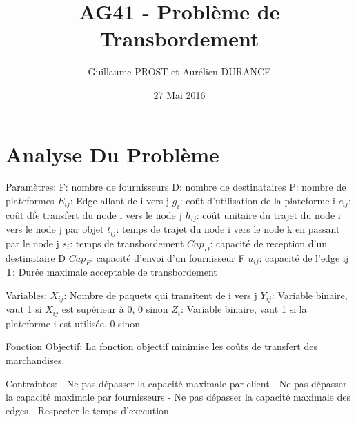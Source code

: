 \documentclass[a4paper,10pt]{article}
\title{AG41 - Problème de Transbordement}
\author{Guillaume PROST et Aurélien DURANCE}
\date{27 Mai 2016}
\begin{document}
\maketitle
\section{Analyse Du Problème}

\hspace{0.5cm} Paramètres:\newline
F: nombre de fournisseurs\newline
D: nombre de destinataires\newline
P: nombre de plateformes\newline
$E_{ij}$: Edge allant de i vers j\newline
$g_{i}$: coût d'utilisation de la plateforme i\newline
$c_{ij}$: coût dfe transfert du node i vers le node j\newline
$h_{ij}$: coût unitaire du trajet du node i vers le node j par objet\newline
$t_{ij}$: temps de trajet du node i vers le node k en passant par le node j\newline
$s_{i}$: temps de transbordement\newline
$Cap_{D}$: capacité de reception d'un destinataire D\newline
$Cap_{F}$: capacité d'envoi d'un fournisseur F\newline
$u_{ij}$: capacité de l'edge ij\newline
T: Durée maximale acceptable de transbordement

Variables:\newline
$X_{ij}$: Nombre de paquets qui transitent de i vers j\newline
$Y_{ij}$: Variable binaire, vaut 1 si $X_{ij}$ est supérieur à 0, 0 sinon\newline
$Z_{i}$: Variable binaire, vaut 1 si la plateforme i est utilisée, 0 sinon

Fonction Objectif:\newline
La fonction objectif minimise les coûts de transfert des marchandises.

Contraintes:\newline
- Ne pas dépasser la capacité maximale par client\newline
- Ne pas dépasser la capacité maximale par fournisseurs\newline
- Ne pas dépasser la capacité maximale des edges\newline
- Respecter le temps d'execution
\newpage
\end{document}
